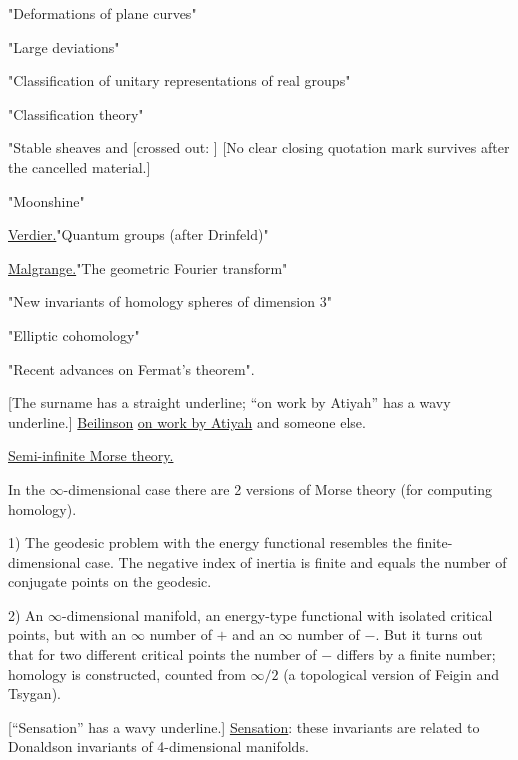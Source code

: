 "Deformations of plane curves"

"Large deviations"

"Classification of unitary representations of real groups"

"Classification theory"

"Stable sheaves and [crossed out: ]
[No clear closing quotation mark survives after the cancelled material.]

"Moonshine"

\underline{Verdier.}\quad "Quantum groups (after Drinfeld)"

\underline{Malgrange.}\quad "The geometric Fourier transform"

"New invariants of homology spheres of dimension $3$"

"Elliptic cohomology"

"Recent advances on Fermat's theorem".

[The surname has a straight underline; “on work by Atiyah” has a wavy underline.]
\underline{Beilinson} \underline{on work by Atiyah} and someone else.

\underline{Semi-infinite Morse theory.}

In the $\infty$-dimensional case there are 2 versions of Morse theory (for computing homology).

1) The geodesic problem with the energy functional resembles the finite-dimensional case.
The negative index of inertia is finite and equals the number of conjugate points on the geodesic.

2) An $\infty$-dimensional manifold, an energy-type functional
with isolated critical points, but with an $\infty$ number of $+$ and an $\infty$ number of $-$.
But it turns out that for two different critical points the number of $-$ differs by a finite
number; homology is constructed, counted from $\infty/2$
(a topological version of Feigin and Tsygan).

[“Sensation” has a wavy underline.]
\underline{Sensation}: these invariants are related to Donaldson invariants
of 4-dimensional manifolds.

\begin{center}
\end{center}

